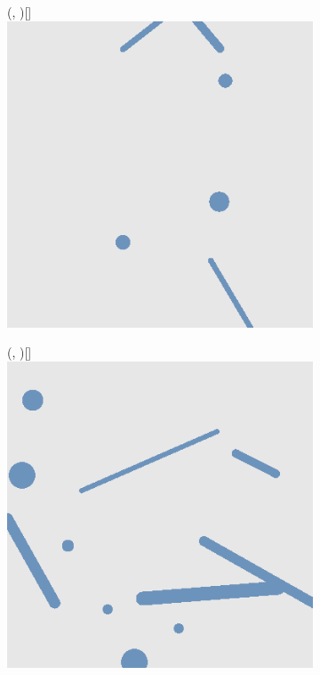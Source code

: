 \def\w{0.31\textwidth}
\begin{figure}[H]
    \begin{subfigure}{\w}
        \makebox(\textwidth, \textwidth)[\textwidth]{
            \includegraphics[width=\linewidth]{figures/generated-worlds/world_0.png}
        }
    \end{subfigure}
    \hspace*{\fill}
    \begin{subfigure}{\w}
        \makebox(\textwidth, \textwidth)[\textwidth]{
            \includegraphics[width=\linewidth]{figures/generated-worlds/world_1.png}
}
\end{subfigure}
\end{figure}
